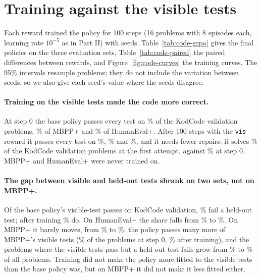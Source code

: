 
\section{Training against the visible tests}\label{sec:res-grpo}

Each reward trained the policy for 100 steps (16 problems with 8 episodes each, learning rate $10^{-5}$ as in Part II)
with  seeds. Table~\ref{tab:code-grpo} gives the final policies on the three evaluation sets,
Table~\ref{tab:code-paired} the paired differences between rewards, and Figure~\ref{fig:code-curves} the training
curves. The 95\% intervals resample problems; they do not include the variation between seeds, so we also give each
seed's value where the seeds disagree.

\paragraph{Training on the visible tests made the code more correct.} At step 0 the base policy passes every test on
\% of the KodCode validation problems, \% of MBPP+ and
\% of HumanEval+. After 100 steps with the \texttt{vis} reward it passes every test on
\%, \% and \%, and it needs fewer repairs: it solves
\% of the KodCode validation problems at the first attempt, against
\% at step 0. MBPP+ and HumanEval+ were never trained on.

\paragraph{The gap between visible and held-out tests shrank on two sets, not on MBPP+.} Of the base policy's
visible-test passes on KodCode validation, \% fail a held-out test; after training
\% do. On HumanEval+ the share falls from \% to
\%. On MBPP+ it barely moves, from \% to
\%: the policy passes many more of MBPP+'s visible tests (\% of the
problems at step 0, \% after training), and the problems where the visible tests pass but a held-out
test fails grow from \% to \% of all problems. Training did not make the
policy more fitted to the visible tests than the base policy was, but on MBPP+ it did not make it less fitted either.

